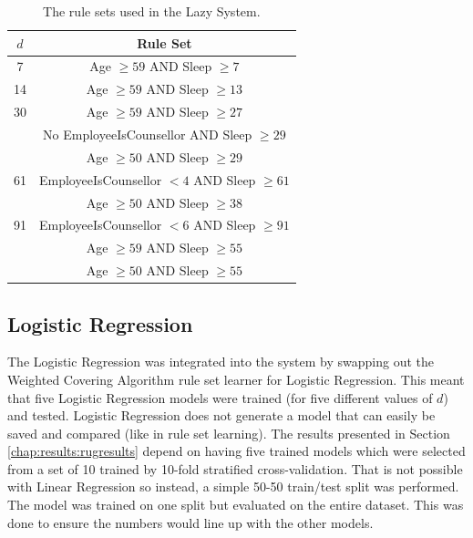 \begin{table}[h]
	\centering

	\begin{tabular}{cc}
	\toprule
	$d$ & Rule Set \\
	\midrule
	7 	& Age $\geq 59$ AND Sleep $\geq 7$ \\
	\midrule
	14	& Age $\geq 59$ AND Sleep $\geq 13$ \\
	\midrule
	30	& Age $\geq 59$ AND Sleep $\geq 27$ \\ 
			& No EmployeeIsCounsellor AND Sleep $\geq 29$ \\
			& Age $\geq 50$ AND Sleep $\geq 29$ \\
	\midrule
	61	& EmployeeIsCounsellor $< 4$ AND Sleep $\geq 61$ \\
			& Age $\geq 50$ AND Sleep $\geq 38$ \\
	\midrule
	91	& EmployeeIsCounsellor $< 6$ AND Sleep $\geq 91$ \\
			& Age $\geq 59$ AND Sleep $\geq 55$ \\
			& Age $\geq 50$ AND Sleep $\geq 55$ \\
	\bottomrule
	\end{tabular}

	\caption{The rule sets used in the Lazy System.}
	\label{tbl:results:lazysets}
\end{table}


\subsection{Logistic Regression}
The Logistic Regression was integrated into the \Abb system by swapping out the Weighted Covering Algorithm rule set learner for Logistic Regression. This meant that five Logistic Regression models were trained (for five different values of $d$) and tested. 
Logistic Regression does not generate a model that can easily be saved and compared (like in rule set learning). The results presented in Section \ref{chap:results:rugresults} depend on having five trained models which were selected from a set of 10 trained by 10-fold stratified cross-validation. That is not possible with Linear Regression so instead, a simple 50-50 train/test split was performed. The model was trained on one split but evaluated on the entire dataset. This was done to ensure the numbers would line up with the other models.

